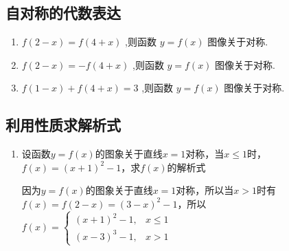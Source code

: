 \subsection*{自对称的代数表达}
\begin{enumerate}
    \item $f\left( {2 - x}\right)  = f\left( {4 + x}\right)$ ,则函数 $y = f\left( x\right)$ 图像关于对称.
    \item $f\left( {2 - x}\right)  =  - f\left( {4 + x}\right)$ ,则函数 $y = f\left( x\right)$ 图像关于对称.
    \item $f\left( {1 - x}\right)  + f\left( {4 + x}\right)  = 3$ ,则函数 $y = f\left( x\right)$ 图像关于对称.
\end{enumerate}

\subsection*{利用性质求解析式}
\begin{enumerate}
    \item 设函数$y = f(x)$的图象关于直线$x = 1$对称，当$x \leq 1$时，$f(x) = (x+1)^2-1$，求$f(x)$的解析式
    \begin{jieda}
        因为$y = f(x)$的图象关于直线$x = 1$对称，所以当$x > 1$时有$f(x) = f(2-x) = (3-x)^2-1$，所以$f(x) = \left\{\begin{array}{ll}
             (x+1)^2-1, & x \leq 1 \\
             (x-3)^3-1, & x > 1 
        \end{array}\right.$
    \end{jieda}
\end{enumerate}


